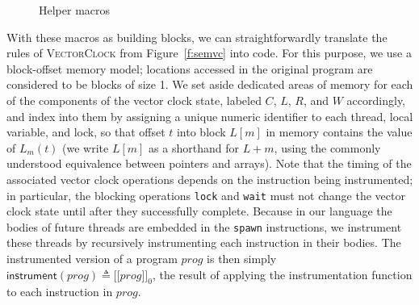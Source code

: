 \documentclass[preprint, 10pt]{sigplanconf}
\newcommand{\VCalg}{\textsc{VectorClock}\xspace}
\newcommand{\meanl}{\ensuremath{[ \! [}}
\newcommand{\meanr}{\ensuremath{] \! ]}}
\newcommand{\means}[1]{\ensuremath{\meanl #1 \meanr}}
\newcommand{\instr}[2]{\ensuremath{\means{#2}_{#1}}}
\newcommand{\instrp}[1]{\ensuremath{\mathsf{instrument}(#1)}}
\begin{document}
\begin{figure}[tb]
\caption{Helper macros}
\label{helper}
\end{figure}

With these macros as building blocks, we can straightforwardly translate the rules of \VCalg from Figure~\ref{f:semvc} into code. For this purpose, we use a block-offset memory model; locations accessed in the original program are considered to be blocks of size 1. We set aside dedicated areas of memory for each of the components of the vector clock state, labeled $C$, $L$, $R$, and $W$ accordingly, and index into them by assigning a unique numeric identifier to each thread, local variable, and lock, so that offset $t$ into block $L[m]$ in memory contains the value of $L_m(t)$ (we write $L[m]$ as a shorthand for $L + m$, using the commonly understood equivalence between pointers and arrays). Note that the timing of the associated vector clock operations depends on the instruction being instrumented; in particular, the blocking operations \texttt{lock} and \texttt{wait} must not change the vector clock state until after they successfully complete.  Because in our language the bodies of future threads are embedded in the \texttt{spawn} instructions, we instrument these threads by recursively instrumenting each instruction in their bodies. The instrumented version of a program $\mathit{prog}$ is then simply $\instrp{\mathit{prog}} \triangleq \instr{0}{\mathit{prog}}$, the result of applying the instrumentation function to each instruction in $\mathit{prog}$.
\end{document}
